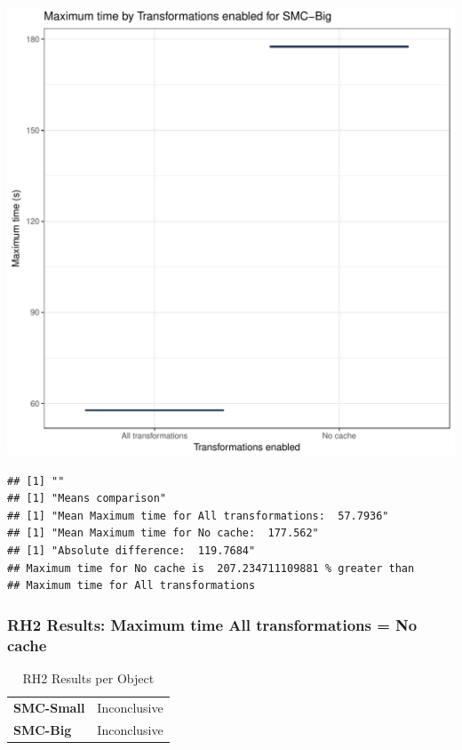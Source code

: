 \documentclass{article}\usepackage[]{graphicx}\usepackage[]{color}
\makeatletter
\def\maxwidth{ %
  \ifdim\Gin@nat@width>\linewidth
    \linewidth
  \else
    \Gin@nat@width
  \fi
}
\newenvironment{kframe}{%
 \def\at@end@of@kframe{}%
 \ifinner\ifhmode%
  \def\at@end@of@kframe{\end{minipage}}%
  \begin{minipage}{\columnwidth}%
 \fi\fi%
 \def\FrameCommand##1{\hskip\@totalleftmargin \hskip-\fboxsep
 \colorbox{shadecolor}{##1}\hskip-\fboxsep
     \hskip-\linewidth \hskip-\@totalleftmargin \hskip\columnwidth}%
 \MakeFramed {\advance\hsize-\width
   \@totalleftmargin\z@ \linewidth\hsize
   \@setminipage}}%
 {\par\unskip\endMakeFramed%
 \at@end@of@kframe}
\newenvironment{knitrout}{}{} %
\makeatother
\begin{document}
\begin{knitrout}
\color{fgcolor}
\includegraphics[width=\maxwidth]{figure/RH2_big-1} 
\begin{kframe}

{\ttfamily\noindent\bfseries\color{errorcolor}{\#\# Error in eval(expr, envir, enclos): object 'shap\_cashew\_big' not found}}\begin{verbatim}
## [1] ""
## [1] "Means comparison"
## [1] "Mean Maximum time for All transformations:  57.7936"
## [1] "Mean Maximum time for No cache:  177.562"
## [1] "Absolute difference:  119.7684"
## Maximum time for No cache is  207.234711109881 % greater than 
## Maximum time for All transformations
\end{verbatim}
\end{kframe}
\end{knitrout}


 

	
	\subsubsection{RH2 Results: Maximum time All transformations = No cache}
	
	
	\begin{table}[H]
	\centering
	\caption{RH2 Results per Object}
	\begin{tabular}{ll}
	\textbf{SMC-Small} & Inconclusive \\
	\textbf{SMC-Big} & Inconclusive \\
	\end{tabular}
	\end{table}
\end{document}

